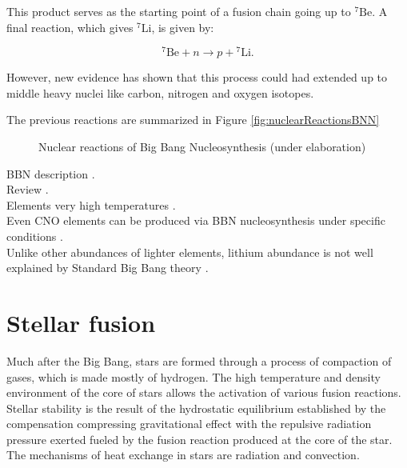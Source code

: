 \documentclass[openany]{book}
\begin{document}
 This product serves as the starting point of a fusion chain going up to $\mathrm{{}^{7}Be}$. A final reaction, which gives $\mathrm{{}^{7}Li}$, is given by: 
 
 \begin{equation} \label{eq:reaction_7Ben}
 	\mathrm{{}^{7}Be} + n \rightarrow p + \mathrm{{}^{7}Li}.
 \end{equation}
 
 However, new evidence has shown that this process could had extended up to middle heavy nuclei like carbon, nitrogen and oxygen isotopes.

The previous reactions are summarized in Figure \ref{fig:nuclearReactionsBNN}

\begin{figure}[H]
	
	\caption[Nuclear reactions of Big Bang Nucleosynthesis]{Nuclear reactions of Big Bang Nucleosynthesis (under elaboration)}
	\label{fig:nuclerReactionsBNN}
\end{figure}


BBN description \cite{coc_vangioni_2010}. \\

Review \cite{patrignani_et_particle-data-group_2016}. \\

Elements very high temperatures \cite{wagoner_fowler_hoyle_1967}. \\

Even CNO elements can be produced via BBN nucleosynthesis under specific conditions \cite{su-qing_kai-su_yong-shou_neng-chuan_zhi-hong_2010}.\\

Unlike other abundances of lighter elements, lithium abundance is not well explained by Standard Big Bang theory \cite{bertulani_2019}. 


\section{Stellar fusion}  \label{sec:StellarFusion}

Much after the Big Bang, stars are formed through a process of compaction of gases, which is made mostly of hydrogen. The high temperature and density environment of the core of stars allows the activation of various fusion reactions.  \\

Stellar stability is the result of the hydrostatic equilibrium established by the compensation compressing gravitational effect with the repulsive radiation pressure exerted fueled by the fusion reaction produced at the core of the star. The mechanisms of heat exchange in stars are radiation and convection. \\
\end{document}
